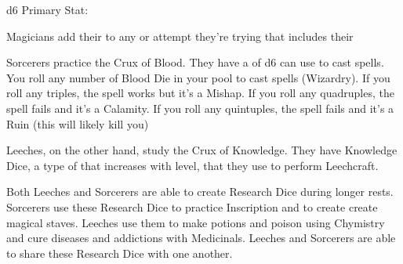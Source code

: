 {{{    }
  }

  \newpage



  \FLESH d6 \hfill Primary Stat: \INT
  



  Magicians add their \LVL to any \RO or \RB  attempt they're trying that includes their \INT

  \cbreak


  Sorcerers practice the Crux of Blood. They have a \POOL of d6 can use to cast spells.  You roll any number of Blood Die in your pool to cast spells (Wizardry). If you roll any triples, the spell works but it's a Mishap. If you roll any quadruples, the spell fails and it's a Calamity. If you roll any quintuples, the spell fails and it's a Ruin (this will likely kill you)

  Leeches, on the other hand, study the Crux of Knowledge.  They have Knowledge Dice, a type of \STATIC that increases with level, that they use to perform Leechcraft.

  Both Leeches and Sorcerers are able to create Research Dice during longer rests.  Sorcerers use these Research Dice to practice Inscription and to create create magical staves.  Leeches use them to make potions and poison using Chymistry and cure diseases and addictions with Medicinals.  Leeches and Sorcerers are able to share these Research Dice with one another.

}
